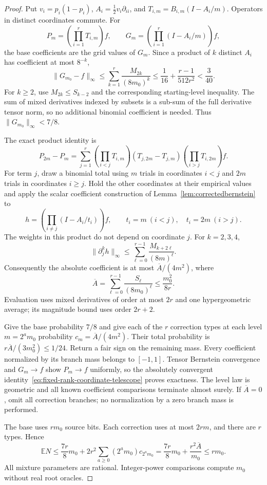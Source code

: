 \begin{proof}
Put $v_i=p_i(1-p_i)$,
$A_i=\frac12v_i\partial_{ii}$, and
$T_{i,m}=B_{i,m}(I-A_i/m)$. Operators in distinct coordinates
commute. For
\[
 P_m=\left(\prod_{i=1}^rT_{i,m}\right)f,
 \qquad
 G_m=\left(\prod_{i=1}^r(I-A_i/m)\right)f,
\]
the base coefficients are the grid values of $G_m$.
Since a product of $k$ distinct $A_i$ has coefficient at most
$8^{-k}$,
\[
 \|G_{m_0}-f\|_\infty
 \le\sum_{k=1}^r\frac{M_{2k}}{(8m_0)^k}
 \le\frac1{16}+\frac{r-1}{512r^2}<\frac3{40}.
\]
For $k\ge2$, use $M_{2k}\le S_{k-2}$ and the corresponding
starting-level inequality. The sum of mixed derivatives indexed by
subsets is a sub-sum of the full derivative tensor norm, so no
additional binomial coefficient is needed. Thus
$\|G_{m_0}\|_\infty<7/8$.

The exact product identity is
\begin{equation}
 P_{2m}-P_m=
 \sum_{j=1}^r
 \left(\prod_{i<j}T_{i,m}\right)
 (T_{j,2m}-T_{j,m})
 \left(\prod_{i>j}T_{i,2m}\right)f.
 \label{eq:fixed-rank-coordinate-telescope}
\end{equation}
For term $j$, draw a binomial total using $m$ trials in coordinates
$i<j$ and $2m$ trials in coordinates $i\ge j$. Hold the other
coordinates at their empirical values and apply the scalar
coefficient construction of Lemma~\ref{lem:correctedbernstein} to
\[
 h=\left(\prod_{i\ne j}(I-A_i/t_i)\right)f,
 \qquad t_i=m\ (i<j),\quad t_i=2m\ (i>j).
\]
The weights in this product do not depend on coordinate $j$.
For $k=2,3,4$,
\[
 \|\partial_j^kh\|_\infty
 \le\sum_{\ell=0}^{r-1}\frac{M_{k+2\ell}}{(8m)^\ell}.
\]
Consequently the absolute coefficient is at most
$\overline A/(4m^2)$, where
\[
 \overline A=
 \sum_{\ell=0}^{r-1}\frac{S_\ell}{(8m_0)^\ell}
 \le\frac{m_0^2}{8r}.
\]
Evaluation uses mixed derivatives of order at most $2r$ and one
hypergeometric average; its magnitude bound uses order $2r+2$.

Give the base probability $7/8$ and give each of the $r$ correction
types at each level $m=2^a m_0$ probability
$c_m=\overline A/(4m^2)$. Their total probability is
$r\overline A/(3m_0^2)\le1/24$. Return a fair sign on the
remaining mass. Every coefficient normalized by its branch mass
belongs to $[-1,1]$. Tensor Bernstein convergence and
$G_m\to f$ show $P_m\to f$ uniformly, so the absolutely
convergent identity~\eqref{eq:fixed-rank-coordinate-telescope}
proves exactness. The level law is geometric and all known
coefficient comparisons terminate almost surely.
If $\overline A=0$, omit all correction branches; no normalization
by a zero branch mass is performed.

The base uses $rm_0$ source bits. Each correction uses at most
$2rm$, and there are $r$ types. Hence
\[
 \mathbb E N
 \le\frac{7r}{8}m_0+
      2r^2\sum_{a\ge0}(2^am_0)c_{2^am_0}
 =\frac{7r}{8}m_0+\frac{r^2\overline A}{m_0}
 \le rm_0.
\]
All mixture parameters are rational. Integer-power comparisons
compute $m_0$ without real root oracles.
\end{proof}

